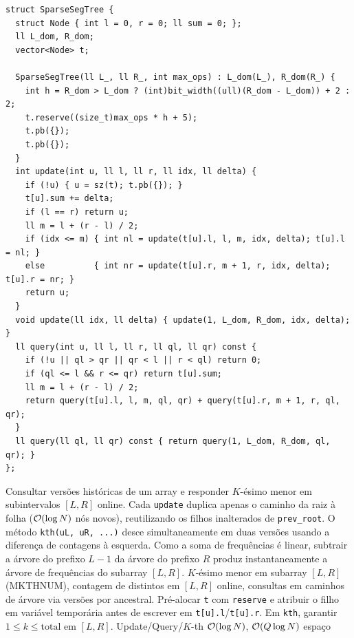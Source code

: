 \begin{lstlisting}
struct SparseSegTree {
  struct Node { int l = 0, r = 0; ll sum = 0; };
  ll L_dom, R_dom;
  vector<Node> t;

  SparseSegTree(ll L_, ll R_, int max_ops) : L_dom(L_), R_dom(R_) {
    int h = R_dom > L_dom ? (int)bit_width((ull)(R_dom - L_dom)) + 2 : 2;
    t.reserve((size_t)max_ops * h + 5);
    t.pb({});
    t.pb({});
  }
  int update(int u, ll l, ll r, ll idx, ll delta) {
    if (!u) { u = sz(t); t.pb({}); }
    t[u].sum += delta;
    if (l == r) return u;
    ll m = l + (r - l) / 2;
    if (idx <= m) { int nl = update(t[u].l, l, m, idx, delta); t[u].l = nl; }
    else          { int nr = update(t[u].r, m + 1, r, idx, delta); t[u].r = nr; }
    return u;
  }
  void update(ll idx, ll delta) { update(1, L_dom, R_dom, idx, delta); }
  ll query(int u, ll l, ll r, ll ql, ll qr) const {
    if (!u || ql > qr || qr < l || r < ql) return 0;
    if (ql <= l && r <= qr) return t[u].sum;
    ll m = l + (r - l) / 2;
    return query(t[u].l, l, m, ql, qr) + query(t[u].r, m + 1, r, ql, qr);
  }
  ll query(ll ql, ll qr) const { return query(1, L_dom, R_dom, ql, qr); }
};
\end{lstlisting}

\algobox
  {Consultar versões históricas de um array e responder $K$-ésimo menor em subintervalos $[L, R]$ online.}
  {Cada \texttt{update} duplica apenas o caminho da raiz à folha ($\mathcal{O}(\log N)$ nós novos), reutilizando os filhos inalterados de \texttt{prev\_root}. O método \texttt{kth(uL, uR, ...)} desce simultaneamente em duas versões usando a diferença de contagens à esquerda.}
  {Como a soma de frequências é linear, subtrair a árvore do prefixo $L-1$ da árvore do prefixo $R$ produz instantaneamente a árvore de frequências do subarray $[L, R]$.}
  {$K$-ésimo menor em subarray $[L, R]$ (MKTHNUM), contagem de distintos em $[L, R]$ online, consultas em caminhos de árvore via versões por ancestral.}
  {Pré-alocar \texttt{t} com \texttt{reserve} e atribuir o filho em variável temporária antes de escrever em \texttt{t[u].l}/\texttt{t[u].r}. Em \texttt{kth}, garantir $1 \le k \le \text{total em } [L, R]$.}
  {Update/Query/$K$-th $\mathcal{O}(\log N)$, $\mathcal{O}(Q \log N)$ espaço}

